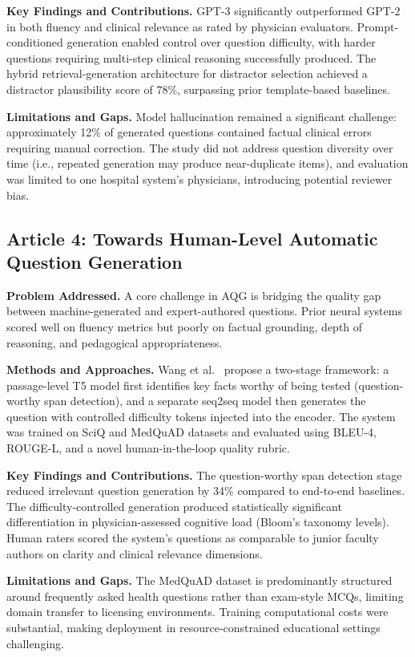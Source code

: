 \documentclass[conference]{IEEEtran}
\begin{document}
\textbf{Key Findings and Contributions.} GPT-3 significantly outperformed GPT-2 in both fluency and clinical relevance as rated by physician evaluators. Prompt-conditioned generation enabled control over question difficulty, with harder questions requiring multi-step clinical reasoning successfully produced. The hybrid retrieval-generation architecture for distractor selection achieved a distractor plausibility score of 78\%, surpassing prior template-based baselines.

\textbf{Limitations and Gaps.} Model hallucination remained a significant challenge: approximately 12\% of generated questions contained factual clinical errors requiring manual correction. The study did not address question diversity over time (i.e., repeated generation may produce near-duplicate items), and evaluation was limited to one hospital system's physicians, introducing potential reviewer bias.

\subsection{Article 4: Towards Human-Level Automatic Question Generation~\cite{wang2022towards}}

\textbf{Problem Addressed.} A core challenge in AQG is bridging the quality gap between machine-generated and expert-authored questions. Prior neural systems scored well on fluency metrics but poorly on factual grounding, depth of reasoning, and pedagogical appropriateness.

\textbf{Methods and Approaches.} Wang et al.~\cite{wang2022towards} propose a two-stage framework: a passage-level T5 model first identifies key facts worthy of being tested (question-worthy span detection), and a separate seq2seq model then generates the question with controlled difficulty tokens injected into the encoder. The system was trained on SciQ and MedQuAD datasets and evaluated using BLEU-4, ROUGE-L, and a novel human-in-the-loop quality rubric.

\textbf{Key Findings and Contributions.} The question-worthy span detection stage reduced irrelevant question generation by 34\% compared to end-to-end baselines. The difficulty-controlled generation produced statistically significant differentiation in physician-assessed cognitive load (Bloom's taxonomy levels). Human raters scored the system's questions as comparable to junior faculty authors on clarity and clinical relevance dimensions.

\textbf{Limitations and Gaps.} The MedQuAD dataset is predominantly structured around frequently asked health questions rather than exam-style MCQs, limiting domain transfer to licensing environments. Training computational costs were substantial, making deployment in resource-constrained educational settings challenging.
\end{document}
